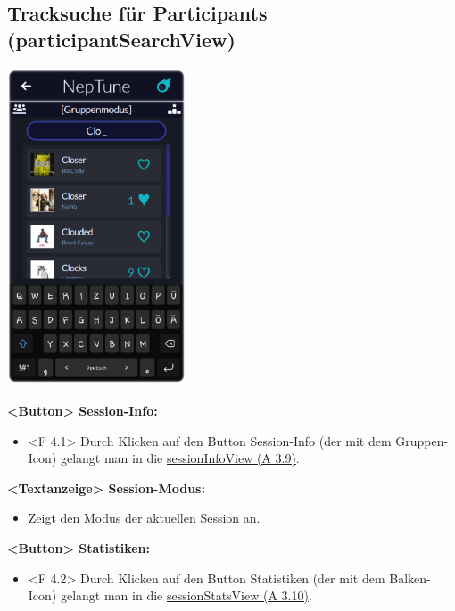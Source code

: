 \documentclass[oneside, ngerman]{sdqtechreport}
\begin{document}
\subsection{Tracksuche für Participants (participantSearchView)}
\label{sec:Benutzeroberfläche:participantSearchView}


\begin{center}
    \hypertarget{participantSearchView}{}
    \includegraphics[width=0.4\textwidth]{LATEX/Pflichtenheft/GraphicDesigns/userSearchPage.png}
\end{center}

\textbf{<Button> Session-Info:}
\begin{itemize}
    \hypertarget{<F 4.1>}{}
    \item <F 4.1> Durch Klicken auf den Button Session-Info (der mit dem Gruppen-Icon) gelangt man in die \hyperlink{sessionInfoView}{sessionInfoView (A 3.9)}.
\end{itemize}

\textbf{<Textanzeige> Session-Modus:}
\begin{itemize}
    \item Zeigt den Modus der aktuellen Session an.
\end{itemize}

\textbf{<Button> Statistiken:}
\begin{itemize}
    \hypertarget{<F 4.2>}{}
    \item <F 4.2> Durch Klicken auf den Button Statistiken (der mit dem Balken-Icon) gelangt man in die \hyperlink{sessionStatsView}{sessionStatsView (A 3.10)}.
\end{itemize}
\end{document}
